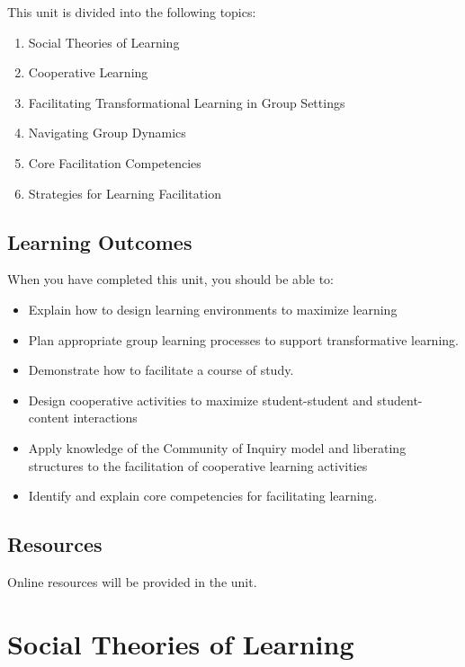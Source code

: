 \documentclass[
]{book}
\providecommand{\tightlist}{%
  \setlength{\itemsep}{0pt}\setlength{\parskip}{0pt}}
\begin{document}
This unit is divided into the following topics:

\begin{enumerate}
\def\labelenumi{\arabic{enumi}.}
\tightlist
\item
  Social Theories of Learning
\item
  Cooperative Learning
\item
  Facilitating Transformational Learning in Group Settings
\item
  Navigating Group Dynamics
\item
  Core Facilitation Competencies
\item
  Strategies for Learning Facilitation
\end{enumerate}

\hypertarget{learning-outcomes-1}{%
\subsection*{Learning Outcomes}\label{learning-outcomes-1}}

When you have completed this unit, you should be able to:

\begin{itemize}
\tightlist
\item
  Explain how to design learning environments to maximize learning
\item
  Plan appropriate group learning processes to support transformative learning.
\item
  Demonstrate how to facilitate a course of study.
\item
  Design cooperative activities to maximize student-student and student-content interactions
\item
  Apply knowledge of the Community of Inquiry model and liberating structures to the facilitation of cooperative learning activities
\item
  Identify and explain core competencies for facilitating learning.
\end{itemize}

\hypertarget{resources-2}{%
\subsection*{Resources}\label{resources-2}}

Online resources will be provided in the unit.

\hypertarget{social-theories-of-learning}{%
\section{Social Theories of Learning}\label{social-theories-of-learning}}
\end{document}
